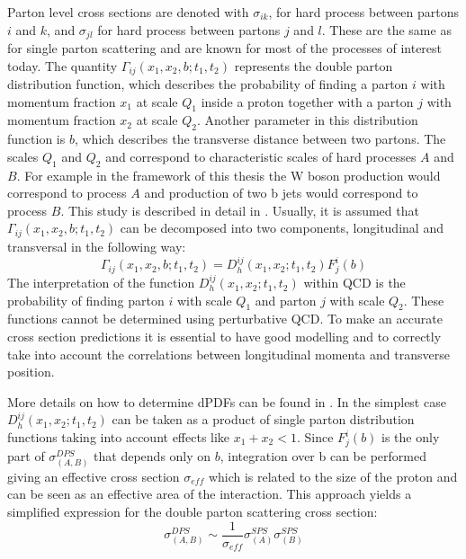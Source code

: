 \par Parton level cross sections are denoted with $\sigma_{ik}$, for hard process between partons $i$ and $k$, and $\sigma_{jl}$ for hard process between partons $j$ and $l$. These are the same as for single parton scattering and are known for most of the processes of interest today. The quantity $\Gamma_{ij}(x_1,x_2,b;t_1,t_2)$ represents the double parton distribution function, which describes the probability of finding a parton $i$ with momentum fraction $x_1$ at scale $Q_1$ inside a proton together with a parton $j$ with momentum fraction $x_2$ at scale $Q_2$. Another parameter in this distribution function is $b$, which describes the transverse distance between two partons. The scales $Q_1$ and $Q_2$ and correspond to characteristic scales of hard processes $A$ and $B$. For example in the framework of this thesis the W boson production would correspond to process $A$ and production of two b jets would correspond to process $B$. This study is described in detail in \cite{Quackenbush:2011bf}. Usually, it is assumed that $\Gamma_{ij}(x_1,x_2,b;t_1,t_2)$ can be decomposed into two components, longitudinal and transversal in the following way:
\begin{equation}
\Gamma_{ij}(x_1,x_2,b;t_1,t_2) = D^{ij}_h(x_1,x_2;t_1,t_2)F_j^i(b)
\end{equation} 
The interpretation of the function $D^{ij}_h(x_1,x_2;t_1,t_2)$ within QCD is the probability of finding parton $i$ with scale $Q_1$ and parton $j$ with scale $Q_2$. These functions cannot be determined using perturbative QCD. To make an accurate cross section predictions it is essential to have good modelling and to correctly take into account the correlations between longitudinal momenta and transverse position. 
\par More details on how to determine dPDFs can be found in \cite{Gaunt:2009re}. In the simplest case $D^{ij}_h(x_1,x_2;t_1,t_2)$ can be taken as a product of single parton distribution functions taking into account effects like $x_1+x_2<1$. Since $F_j^i(b)$ is the only part of $\sigma_{(A,B)}^{DPS}$ that depends only on $b$, integration over b can be performed giving an effective cross section $\sigma_{eff}$ which is related to the size of the proton and can be seen as an effective area of the interaction. This approach yields a simplified expression for the double parton scattering cross section:
\begin{equation}
\sigma_{(A,B)}^{DPS} \sim \frac{1}{\sigma_{eff}} \sigma^{SPS}_{(A)} \sigma^{SPS}_{(B)}
\end{equation}
